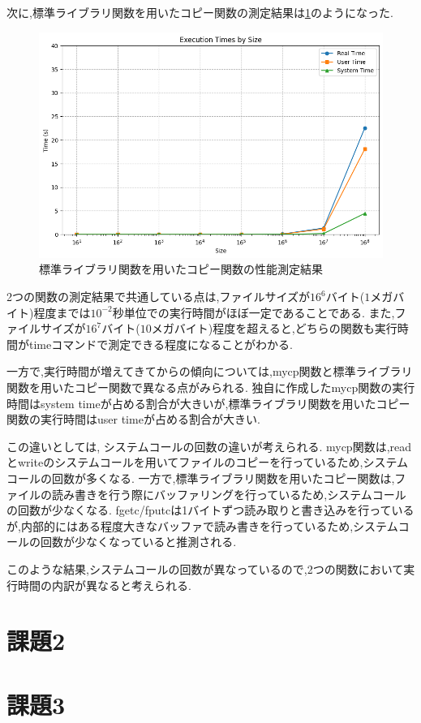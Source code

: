 \documentclass[autodetect-engine, dvi=dvipdfmx, 10pt, a4paper, ja=standard]{bxjsarticle}
\begin{document}
次に,標準ライブラリ関数を用いたコピー関数の測定結果は\ref{fig:ex-1-stdio}のようになった.

\begin{figure}[H]
	\centering
	\includegraphics[width=0.8\linewidth]{./syscp.png}
	\caption{標準ライブラリ関数を用いたコピー関数の性能測定結果}
	\label{fig:ex-1-stdio}
\end{figure}

2つの関数の測定結果で共通している点は,ファイルサイズが$16^6$バイト($1$メガバイト)程度までは$10^{-2}$秒単位での実行時間がほぼ一定であることである.
また,ファイルサイズが$16^7$バイト($10$メガバイト)程度を超えると,どちらの関数も実行時間がtimeコマンドで測定できる程度になることがわかる.

一方で,実行時間が増えてきてからの傾向については,mycp関数と標準ライブラリ関数を用いたコピー関数で異なる点がみられる.
独自に作成したmycp関数の実行時間はsystem timeが占める割合が大きいが,標準ライブラリ関数を用いたコピー関数の実行時間はuser timeが占める割合が大きい.

この違いとしては, システムコールの回数の違いが考えられる.
mycp関数は,readとwriteのシステムコールを用いてファイルのコピーを行っているため,システムコールの回数が多くなる.
一方で,標準ライブラリ関数を用いたコピー関数は,ファイルの読み書きを行う際にバッファリングを行っているため,システムコールの回数が少なくなる.
fgetc/fputcは1バイトずつ読み取りと書き込みを行っているが,内部的にはある程度大きなバッファで読み書きを行っているため,システムコールの回数が少なくなっていると推測される.

このような結果,システムコールの回数が異なっているので,2つの関数において実行時間の内訳が異なると考えられる.

\section{課題2}
\label{sec:ex-2}



\section{課題3}
\label{sec:ex-3}


\end{document}
